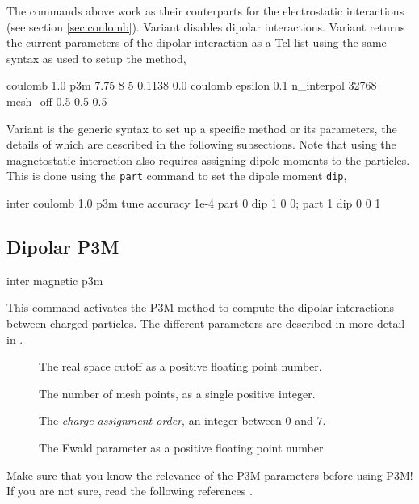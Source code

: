 The commands above work as their couterparts for the electrostatic
interactions (see section \vref{sec:coulomb}).  Variant 
disables dipolar interactions.  Variant  returns the
current parameters of the dipolar interaction as a Tcl-list using the
same syntax as used to setup the method, \eg
\begin{tclcode}
  {coulomb 1.0 p3m 7.75 8 5 0.1138 0.0}
  {coulomb epsilon 0.1 n_interpol 32768 mesh_off 0.5 0.5 0.5}
\end{tclcode}

Variant  is the generic syntax to set up a specific method
or its parameters, the details of which are described in the following
subsections.  Note that using the magnetostatic interaction also
requires assigning dipole moments to the particles.  This is done
using the \texttt{part} command to set the dipole moment \texttt{dip},
\eg
\begin{tclcode}
  inter coulomb 1.0 p3m tune accuracy 1e-4
  part 0 dip 1 0 0; part 1 dip 0 0 1
\end{tclcode}

\subsection{Dipolar P3M}

\begin{essyntax}
  inter magnetic  p3m 
     
  \begin{features}
  \end{features}
\end{essyntax}

This command activates the P3M method to compute the dipolar
interactions between charged particles.  The different parameters are
described in more detail in \cite{cerda08a}.
\begin{description}
\item[] The real space cutoff as a positive
  floating point number.
\item[] The number of mesh points, as a single positive
  integer.
\item[] The \emph{charge-assignment order}, an integer
  between $0$ and $7$.
\item[] The Ewald parameter as a positive floating point
  number.
\end{description}

Make sure that you know the relevance of the P3M parameters before
using P3M! If you are not sure, read the following references
\cite{ewald21, hockney88, kolafa92, deserno98, deserno98a, deserno00,
  deserno00a}.

